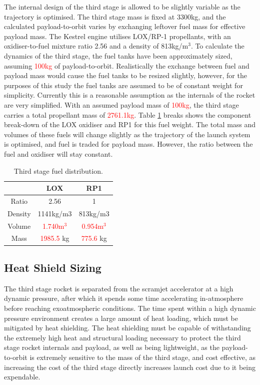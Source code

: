 The internal design of the third stage is allowed to be slightly variable as the trajectory is optimised. The third stage mass is fixed at 3300kg, and the calculated payload-to-orbit varies by exchanging leftover fuel mass for effective payload mass. The Kestrel engine utilises LOX/RP-1 propellants, with an oxidiser-to-fuel mixture ratio 2.56\cite{RPE} and a density of 813kg/m$^3$\cite{Magee}. 
To calculate the dynamics of the third stage, the fuel tanks have been approximately sized, assuming \textcolor{red}{100kg} of payload-to-orbit. Realistically the exchange between fuel and payload mass would cause the fuel tanks to be resized slightly, however, for the purposes of this study the fuel tanks are assumed to be of constant weight for simplicity. Currently this is a reasonable assumption as the internals of the rocket are very simplified. With an assumed payload mass of \textcolor{red}{100kg}, the third stage carries a total propellant mass of \textcolor{red}{2761.1kg}. Table \ref{tab:Fuel} breaks shows the component break-down of the LOX oxidiser and RP1 for this fuel weight. The total mass and volumes of these fuels will change slightly as the trajectory of the launch system is optimised, and fuel is traded for payload mass. However, the ratio between the fuel and oxidiser will stay constant. 

	

\begin{table}[h]
	\centering
	\begin{tabular}{|c|c|c|}
		\hline  & \textbf{LOX} & \textbf{RP1} \\ 
		\hline Ratio & 2.56\cite{RPE} & 1 \\ 
		\hline Density & 1141kg/m3 & 813kg/m3\cite{Magee}\\ 
		\hline Volume & \textcolor{red}{1.740m$^3$} & \textcolor{red}{0.954m$^3$} \\ 
		\hline Mass & \textcolor{red}{1985.5} kg & \textcolor{red}{775.6} kg \\ 
		\hline 
	\end{tabular} 
	\caption{Third stage fuel distribution.} %
	\label{tab:Fuel}
\end{table}



\subsection{Heat Shield Sizing}

The third stage rocket is separated from the scramjet accelerator at a high dynamic pressure, after which it spends some time accelerating in-atmosphere before reaching exoatmospheric conditions. The time spent within a high dynamic pressure environment creates a large amount of heat loading, which must be mitigated by heat shielding. The heat shielding must be capable of withstanding the extremely high heat and structural loading necessary to protect the third stage rocket internals and payload, as well as being lightweight, as the payload-to-orbit is extremely sensitive to the mass of the third stage, and cost effective, as increasing the cost of the third stage directly increases launch cost due to it being expendable. 



